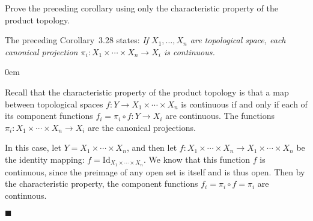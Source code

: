 \documentclass[12pt]{article}
\renewcommand{\qed}{\hfill$\blacksquare$}
\renewenvironment{proof}{\begin{addmargin}[1em]{0em}\begin{newproof}}{\end{newproof}\end{addmargin}\qed}
\newenvironment{exercise}[2][Exercise]{\begin{trivlist}
\item[\hskip \labelsep {\bfseries #1}\hskip \labelsep {\bfseries #2.}]}{\end{trivlist}}
\begin{document}
\begin{exercise}{3.29}
Prove the preceding corollary using only the characteristic property of the product topology.
\end{exercise}
The preceding Corollary~3.28 states:
\textit{If $X_1,\ldots,X_n$ are topological space, each canonical projection $\pi_i:X_1\times \cdots \times X_n \rightarrow X_i$ is continuous.}\\
\begin{proof}
Recall that the characteristic property of the product topology is that a map between topological spaces $f:Y\rightarrow X_1\times \cdots \times X_n$ is continuous if and only if each of its component functions $f_i = \pi_i \circ f:Y\rightarrow X_i$ are continuous. The functions $\pi_i:X_1\times \cdots \times X_n \rightarrow X_i$ are the canonical projections.

In this case, let $Y= X_1 \times \cdots \times X_n$, and then let $f:X_1\times \cdots \times X_n \rightarrow X_1 \times \cdots \times X_n$ be the identity mapping: $f = \text{Id}_{X_1 \times \cdots \times X_n}$. We know that this function $f$ is continuous, since the preimage of any open set is itself and is thus open. Then by the characteristic property, the component functions $f_i = \pi_i \circ f = \pi_i$ are continuous.
\end{proof}
\end{document}
